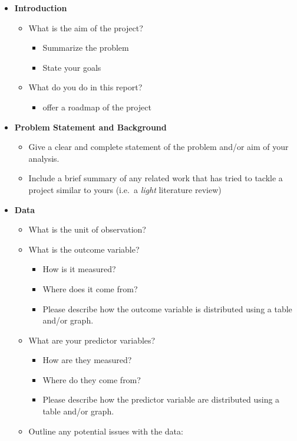 \documentclass[
  12pt,
]{article}
\providecommand{\tightlist}{%
  \setlength{\itemsep}{0pt}\setlength{\parskip}{0pt}}
\begin{document}
\begin{itemize}
\item
  \textbf{Introduction}

  \begin{itemize}
  \tightlist
  \item
    What is the aim of the project?

    \begin{itemize}
    \tightlist
    \item
      Summarize the problem
    \item
      State your goals
    \end{itemize}
  \item
    What do you do in this report?

    \begin{itemize}
    \tightlist
    \item
      offer a roadmap of the project
    \end{itemize}
  \end{itemize}
\item
  \textbf{Problem Statement and Background}

  \begin{itemize}
  \item
    Give a clear and complete statement of the problem and/or aim of
    your analysis.
  \item
    Include a brief summary of any related work that has tried to tackle
    a project similar to yours (i.e.~a \emph{light} literature review)
  \end{itemize}
\item
  \textbf{Data}

  \begin{itemize}
  \item
    What is the unit of observation?
  \item
    What is the outcome variable?

    \begin{itemize}
    \tightlist
    \item
      How is it measured?
    \item
      Where does it come from?
    \item
      Please describe how the outcome variable is distributed using a
      table and/or graph.
    \end{itemize}
  \item
    What are your predictor variables?

    \begin{itemize}
    \tightlist
    \item
      How are they measured?
    \item
      Where do they come from?
    \item
      Please describe how the predictor variable are distributed using a
      table and/or graph.
    \end{itemize}
  \item
    Outline any potential issues with the data:


\end{itemize}
\end{itemize}
\end{document}
